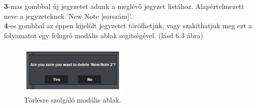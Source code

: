 \vspace{5pt} \noindent \textbf{3}-mas gombbal új jegyzetet adunk a meglévő jegyzet listához. Alapértelmezett neve a jegyzeteknek ’New Note [sorszám]’.
\vspace{5pt} \\ \textbf{4}-es gombbal az éppen kijelölt jegyzetet törölhetjük, vagy szakíthatjuk meg ezt a folyamatot egy felugró modális ablak segítségével. (lásd 6.3 ábra)

\begin{figure}[h]
	\centering
	\includegraphics[scale=0.6]{images/doc_3.png}
	\caption{Törlésre szolgáló modális ablak.}
	\label{fig:menu_notes_delete}
\end{figure}

